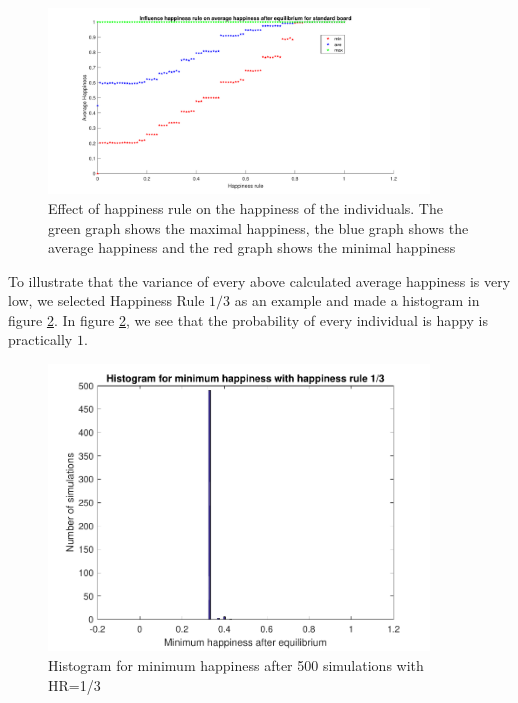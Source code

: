 \begin{figure}[h!]
    \centering
    \includegraphics[width=0.9\textwidth]{happinessregel-gemhappinesseind-2.pdf}
    \caption{Effect of happiness rule on the happiness of the individuals. The green graph shows the maximal happiness, the blue graph shows the average happiness and the red graph shows the minimal happiness}
    \label{happyhappy}
\end{figure}

To illustrate that the variance of every above calculated average happiness is very low, we  selected Happiness Rule $1/3$ as an example and made a histogram in figure \ref{minhappy}. 
In figure \ref{minhappy}, we see that the probability of every individual is happy is practically $1$.

\begin{figure}[H]
    \centering
    \includegraphics[width=0.9\textwidth]{histogram_min_happiness_een_derde}
    \caption{Histogram for minimum happiness after 500 simulations with HR=1/3 }
    \label{minhappy}
\end{figure}

